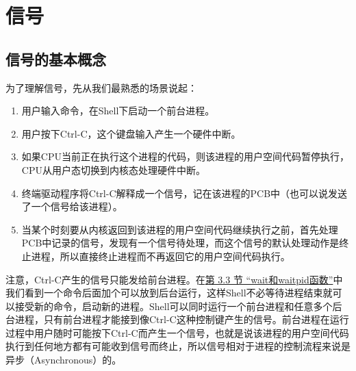 

\chapter{信号}
%





\section{信号的基本概念}
%
为了理解信号，先从我们最熟悉的场景说起：


\begin{enumerate}

\item 用户输入命令，在Shell下启动一个前台进程。

\item 用户按下Ctrl-C，这个键盘输入产生一个硬件中断。

\item 如果CPU当前正在执行这个进程的代码，则该进程的用户空间代码暂停执行，CPU从用户态切换到内核态处理硬件中断。

\item 终端驱动程序将Ctrl-C解释成一个信号，记在该进程的PCB中（也可以说发送了一个信号给该进程）。

\item 当某个时刻要从内核返回到该进程的用户空间代码继续执行之前，首先处理PCB中记录的信号，发现有一个信号待处理，而这个信号的默认处理动作是终止进程，所以直接终止进程而不再返回它的用户空间代码执行。
\end{enumerate}


注意，Ctrl-C产生的信号只能发给前台进程。在\hyperlink{db.ch30s03.id2867242}{第 3.\BookSplit{}3 节 “wait和waitpid函数”}中我们看到一个命令后面加个\BookCode{\&}可以放到后台运行，这样Shell不必等待进程结束就可以接受新的命令，启动新的进程。Shell可以同时运行一个前台进程和任意多个后台进程，只有前台进程才能接到像Ctrl-C这种控制键产生的信号。前台进程在运行过程中用户随时可能按下Ctrl-C而产生一个信号，也就是说该进程的用户空间代码执行到任何地方都有可能收到信号而终止，所以信号相对于进程的控制流程来说是异步（Asynchronous）的。



